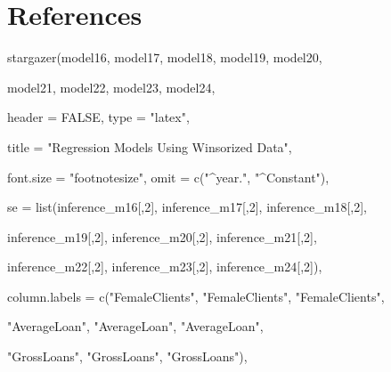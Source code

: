 \documentclass[a4paper,nobind]{templates/ociamthesis}
\newenvironment{Shaded}{\begin{snugshade}}{\end{snugshade}}
\newcommand{\AttributeTok}[1]{\textcolor[rgb]{0.77,0.63,0.00}{#1}}
\newcommand{\ConstantTok}[1]{\textcolor[rgb]{0.00,0.00,0.00}{#1}}
\newcommand{\DecValTok}[1]{\textcolor[rgb]{0.00,0.00,0.81}{#1}}
\newcommand{\FunctionTok}[1]{\textcolor[rgb]{0.00,0.00,0.00}{#1}}
\newcommand{\NormalTok}[1]{#1}
\newcommand{\StringTok}[1]{\textcolor[rgb]{0.31,0.60,0.02}{#1}}
\renewenvironment{Shaded}
{
  \vspace{10pt}%
  \begin{snugshade}%
}{%
  \end{snugshade}%
  \vspace{8pt}%
}
\begin{document}
\hypertarget{references}{%
\section{\texorpdfstring{\textbf{References}}{References}}\label{references}}

\hypertarget{refs}{}
\begin{CSLReferences}{0}{0}
\end{CSLReferences}

\begin{landscape}
\newpage

\begin{Shaded}
\begin{Highlighting}[]
\FunctionTok{stargazer}\NormalTok{(model16, model17, model18, model19, model20, }
          
\NormalTok{          model21, model22, model23, model24, }
          
          \AttributeTok{header =} \ConstantTok{FALSE}\NormalTok{, }\AttributeTok{type =} \StringTok{"latex"}\NormalTok{,}
          
          \AttributeTok{title =} \StringTok{"Regression Models Using Winsorized Data"}\NormalTok{, }
          
\AttributeTok{font.size =} \StringTok{"footnotesize"}\NormalTok{, }\AttributeTok{omit =} \FunctionTok{c}\NormalTok{(}\StringTok{"\^{}year."}\NormalTok{, }\StringTok{"\^{}Constant"}\NormalTok{),}

\AttributeTok{se =} \FunctionTok{list}\NormalTok{(inference\_m16[,}\DecValTok{2}\NormalTok{], inference\_m17[,}\DecValTok{2}\NormalTok{], inference\_m18[,}\DecValTok{2}\NormalTok{], }
          
\NormalTok{          inference\_m19[,}\DecValTok{2}\NormalTok{], inference\_m20[,}\DecValTok{2}\NormalTok{], inference\_m21[,}\DecValTok{2}\NormalTok{],}
          
\NormalTok{          inference\_m22[,}\DecValTok{2}\NormalTok{], inference\_m23[,}\DecValTok{2}\NormalTok{], inference\_m24[,}\DecValTok{2}\NormalTok{]),}

\AttributeTok{column.labels =} \FunctionTok{c}\NormalTok{(}\StringTok{"FemaleClients"}\NormalTok{, }\StringTok{"FemaleClients"}\NormalTok{, }\StringTok{"FemaleClients"}\NormalTok{, }
                  
                  \StringTok{"AverageLoan"}\NormalTok{, }\StringTok{"AverageLoan"}\NormalTok{, }\StringTok{"AverageLoan"}\NormalTok{, }
                  
                  \StringTok{"GrossLoans"}\NormalTok{, }\StringTok{"GrossLoans"}\NormalTok{, }\StringTok{"GrossLoans"}\NormalTok{), }


\end{Highlighting}
\end{Shaded}
\end{landscape}
\end{document}
